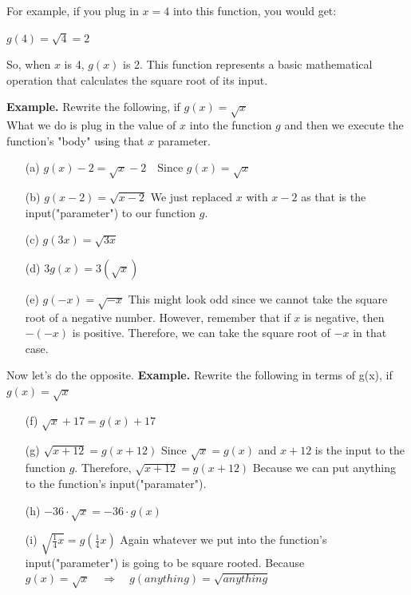 For example, if you plug in $x = 4$ into this function, you would get:

$g(4) = \sqrt{4} = 2$

So, when $x$ is 4, $g(x)$ is 2. This function represents a basic mathematical operation that calculates the square root of its input.

\textbf{Example.} Rewrite the following, if $g(x) = \sqrt{x}$ \\
What we do is plug in the value of $x$ into the function $g$ and then we execute the function's "body" using that $x$ parameter. \\
\begin{enumerate}
	\item [(a)] $g(x)-2=\sqrt{x}-2 \quad \text{Since $g(x)=\sqrt{x}$}$
	\item [(b)] $g(x-2) = \sqrt{x-2}$ \quad
	We just replaced $x$ with $x-2$ as that is the input("parameter") to our function $g$.
	\item [(c)] $g(3x) = \sqrt{3x}$ \quad
	\item [(d)] $3g(x) = 3(\sqrt{x})$ \quad {}
	\item [(e)] $g(-x) = \sqrt{-x}$ \quad
	This might look odd since we cannot take the square root of a negative number. However, remember that if $x$ is negative, then $-(-x)$ is positive. Therefore, we can take the square root of $-x$ in that case.
\end{enumerate}

Now let's do the opposite.
\textbf{Example.} Rewrite the following in terms of g(x), if $g(x) = \sqrt{x}$ \\
\begin{enumerate}
	\item [(f)] $\sqrt{x}+17=g(x)+17$
	\item [(g)] $\sqrt{x+12}=g(x+12)$ \quad Since $\sqrt{x}=g(x)$ and $x+12$ is the input to the function $g$. Therefore, $\sqrt{x+12}=g(x+12)$ Because we can put anything to the function's input("paramater").
	\item [(h)] $-36\cdot\sqrt{x}=-36\cdot g(x)$
	\item [(i)] $\sqrt{\frac{1}{4}x}=g(\frac{1}{4}x)$ \quad Again whatever we put into the function's input("parameter") is going to be square rooted. Because $g(x)=\sqrt{x} \quad \Rightarrow \quad g(anything)=\sqrt{anything}$
\end{enumerate}

